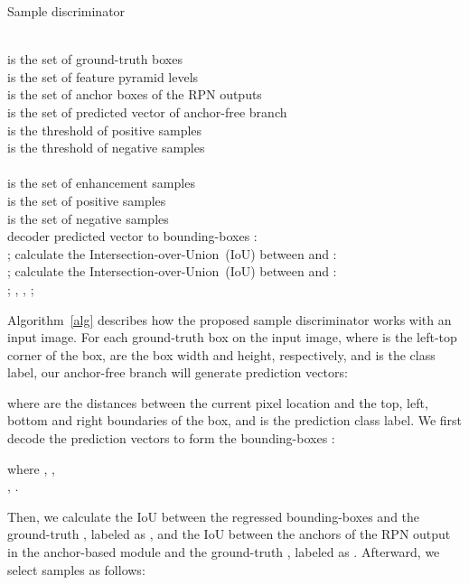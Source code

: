 \documentclass[journal]{IEEEtran}
\begin{document}
\begin{algorithm}[!t] 
\caption{Sample discriminator} 
\label{alg} 
\begin{algorithmic}[1] 
\REQUIRE ~~\\ 
 is the set of ground-truth boxes \\
 is the set of feature pyramid levels\\
 is the set of anchor boxes of the RPN outputs  \\
 is the set of predicted vector of anchor-free branch \\
 is the threshold of positive samples \\
 is the threshold of negative samples \\
\ENSURE ~~\\ 
 is the set of enhancement samples \\
 is the set of positive samples \\
 is the set of negative samples \\
\STATE decoder predicted vector  to bounding-boxes : \\
;
\ENDFOR
\STATE calculate the Intersection-over-Union~(IoU) between  and : \\
;
\STATE calculate the Intersection-over-Union~(IoU) between  and : \\
;
\STATE 
{}
\STATE 
\ELSIF{}
\STATE 
\ENDIF
\ENDFOR
\STATE 
\RETURN , , ;
\end{algorithmic}
\end{algorithm}
Algorithm~\ref{alg} describes how the proposed sample discriminator works with an input image. For each ground-truth box  on the input image, where  is the left-top corner of the box,  are the box width and height, respectively, and  is the class label, our anchor-free branch will generate prediction vectors: 

where  are the distances between the current pixel location  and the top, left, bottom and right boundaries of the box, and  is the prediction class label. We first decode the prediction vectors  to form the bounding-boxes :

where , ,\\ , . 

Then, we calculate the IoU between the regressed bounding-boxes  and the ground-truth , labeled as , and the IoU between the anchors of the RPN output in the anchor-based module  and the ground-truth , labeled as . Afterward, we select samples as follows: 
\end{document}

